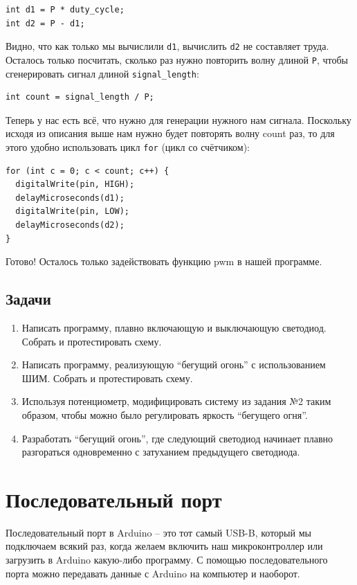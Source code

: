 \documentclass[a4paper,twoside]{book}
\begin{document}
\begin{verbatim}
int d1 = P * duty_cycle;
int d2 = P - d1;
\end{verbatim}

Видно, что как только мы вычислили \texttt{d1}, вычислить \texttt{d2} не
составляет труда. Осталось только посчитать, сколько раз нужно повторить волну
длиной \texttt{P}, чтобы сгенерировать сигнал длиной \texttt{signal\_length}:

\begin{verbatim}
int count = signal_length / P;
\end{verbatim}

Теперь у нас есть всё, что нужно для генерации нужного нам сигнала. Поскольку
исходя из описания выше нам нужно будет повторять волну count раз, то для этого
удобно использовать цикл \texttt{for} (цикл со счётчиком):

\begin{verbatim}
for (int c = 0; c < count; c++) {
  digitalWrite(pin, HIGH);
  delayMicroseconds(d1);
  digitalWrite(pin, LOW);
  delayMicroseconds(d2);
}
\end{verbatim}

Готово! Осталось только задействовать функцию pwm в нашей программе.

\subsection{Задачи}

\begin{enumerate}
\item Написать программу, плавно включающую и выключающую светодиод. Собрать и
  протестировать схему. 
\item Написать программу, реализующую ``бегущий огонь'' с использованием ШИМ.
  Собрать и протестировать схему.
\item Используя потенциометр, модифицировать систему из задания №2 таким
  образом, чтобы можно было регулировать яркость ``бегущего огня''.
\item Разработать ``бегущий огонь'', где следующий светодиод начинает плавно
  разгораться одновременно с затуханием предыдущего светодиода.
\end{enumerate}

\section{Последовательный порт}

Последовательный порт в Arduino -- это тот самый USB-B, который мы подключаем
всякий раз, когда желаем включить наш микроконтроллер или загрузить в Arduino
какую-либо программу. С помощью последовательного порта можно передавать данные
с Arduino на компьютер и наоборот.
\end{document}
